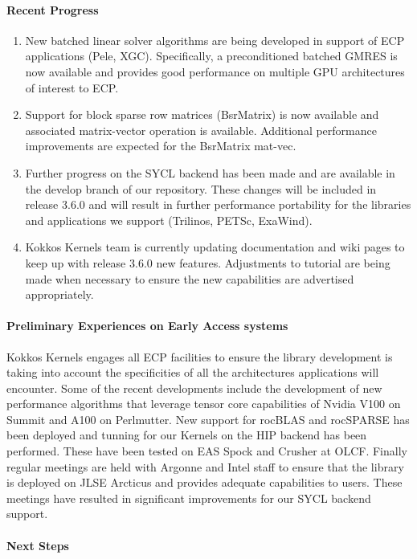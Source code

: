 \paragraph{Recent Progress}
\begin{enumerate}
\item New batched linear solver algorithms are being developed in support of ECP applications (Pele, XGC).
Specifically, a preconditioned batched GMRES is now available and provides good performance on multiple GPU
architectures of interest to ECP.
\item Support for block sparse row matrices (BsrMatrix) is now available and associated matrix-vector
operation is available. Additional performance improvements are expected for the BsrMatrix mat-vec.
\item Further progress on the SYCL backend has been made and are available in the develop branch of
our repository. These changes will be included in release 3.6.0 and will result in further performance
portability for the libraries and applications we support (Trilinos, PETSc, ExaWind).
\item Kokkos Kernels team is currently updating documentation and wiki pages to keep up with release 3.6.0
new features. Adjustments to tutorial are being made when necessary to ensure the new capabilities are
advertised appropriately.
\end{enumerate}

\paragraph{Preliminary Experiences on Early Access systems}
Kokkos Kernels engages all ECP facilities to ensure the library development is taking into account
the specificities of all the architectures applications will encounter. Some of the recent developments
include the development of new performance algorithms that leverage tensor core capabilities of
Nvidia V100 on Summit and A100 on Perlmutter. New support for rocBLAS and rocSPARSE has been deployed
and tunning for our Kernels on the HIP backend has been performed. These have been tested on EAS Spock
and Crusher at OLCF. Finally regular meetings are held with Argonne and Intel staff to ensure that the
library is deployed on JLSE Arcticus and provides adequate capabilities to users. These meetings have
resulted in significant improvements for our SYCL backend support.

\paragraph{Next Steps}

